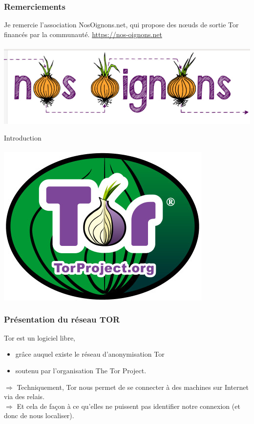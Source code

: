 \documentclass{beamer}
\begin{document}
\begin{frame}
\frametitle{Remerciements}
Je remercie l'association NosOignons.net, qui propose des nœuds de sortie Tor financés par la communauté.
\url{https://nos-oignons.net}
\\~\\
\includegraphics[scale=0.4]{./images/NosOignons.jpg}
\end{frame}
\begin{frame}
\begin{center}
\Huge{Introduction}
\\~\\ \includegraphics[scale=0.4]{./images/logo_tor.jpg}
\end{center}
\end{frame}
\begin{frame}
\frametitle{Présentation du réseau TOR}
Tor est un logiciel libre,
\begin{itemize}
\item grâce auquel existe le réseau d'anonymisation Tor
\item  soutenu par l'organisation The Tor Project.
\end{itemize}
$\Rightarrow$ Techniquement, Tor nous permet de se connecter à des machines sur Internet via des relais. 
\\$\Rightarrow$ Et cela de façon à ce qu'elles ne puissent pas identifier notre connexion (et donc de nous localiser).
\end{frame}
\end{document}
